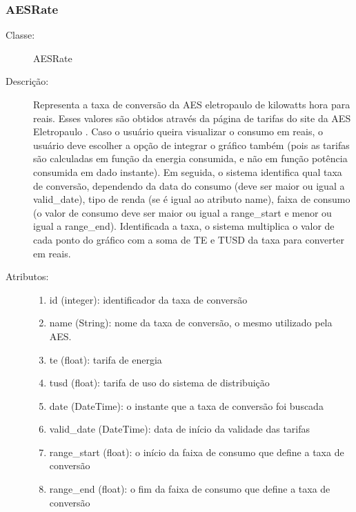 \subsubsection{AESRate}
\begin{description}
	\item[Classe:] AESRate
	\item[Descrição:] Representa a taxa de conversão da AES eletropaulo de kilowatts hora para reais. Esses valores são obtidos através da página de tarifas do site da AES Eletropaulo \cite{aes_site}. Caso o usuário queira visualizar o consumo em reais, o usuário deve escolher a opção de integrar o gráfico também (pois as tarifas são calculadas em função da energia consumida, e não em função potência consumida em dado instante). Em seguida, o sistema identifica qual taxa de conversão, dependendo da data do consumo (deve ser maior ou igual a valid\_date), tipo de renda (se é igual ao atributo name), faixa de consumo (o valor de consumo deve ser maior ou igual a range\_start e menor ou igual a range\_end). Identificada a taxa, o sistema multiplica o valor de cada ponto do gráfico com a soma de TE e TUSD da taxa para converter em reais.
	\item[Atributos:] \hfill
		\begin{enumerate}
			\item id (integer): identificador da taxa de conversão
			\item name (String): nome da taxa de conversão, o mesmo utilizado pela AES.
			\item te (float): tarifa de energia
			\item tusd (float): tarifa de uso do sistema de distribuição
			\item date (DateTime): o instante que a taxa de conversão foi buscada
			\item valid\_date (DateTime): data de início da validade das tarifas
			\item range\_start (float): o início da faixa de consumo que define a taxa de conversão
		    \item range\_end (float): o fim da faixa de consumo que define a taxa de conversão
		\end{enumerate}
\end{description} 